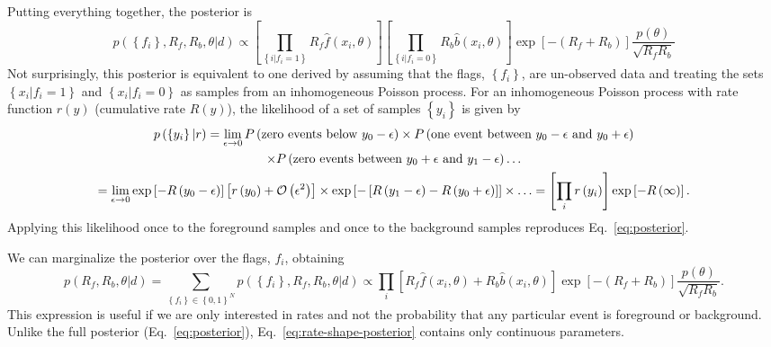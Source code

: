\documentclass[aps,prd]{revtex4-1}
\newcommand{\order}[1]{\mathcal{O}\left( #1 \right)}
\newcommand{\mathset}[1]{\left\{ #1 \right\}}
\begin{document}
Putting everything together, the posterior is
\begin{equation}
  \label{eq:posterior}
  p\left( \mathset{f_i}, R_f, R_b, \theta | d \right) \propto \left[
    \prod_{\mathset{i | f_i = 1}} R_f \hat{f}\left(x_i, \theta\right) \right]
  \left[ \prod_{\mathset{i | f_i = 0}} R_b \hat{b}\left( x_i, \theta\right)
  \right] \exp\left[ - \left(R_f + R_b\right) \right]
  \frac{p(\theta)}{\sqrt{R_f R_b}}
\end{equation}
Not surprisingly, this posterior is equivalent to one derived by
assuming that the flags, $\mathset{f_i}$, are un-observed data and
treating the sets $\mathset{x_i | f_i = 1}$ and $\mathset{x_i | f_i =
  0}$ as samples from an inhomogeneous Poisson process.  For an
inhomogeneous Poisson process with rate function $r(y)$ (cumulative
rate $R(y)$), the likelihood of a set of samples $\mathset{y_i}$ is
given by 
\begin{multline}
  p\left( \mathset{y_i} | r \right) = \lim_{\epsilon \to 0} P\left(
  \textnormal{zero events below } y_0 - \epsilon \right) \times
  P\left( \textnormal{one event between } y_0 - \epsilon \textnormal{
    and } y_0 + \epsilon \right) \\ \times P\left( \textnormal{zero
    events between } y_0+\epsilon \textnormal{ and } y_1 - \epsilon
  \right) \ldots \\ = \lim_{\epsilon \to 0} \exp\left[ - R\left(y_0 -
    \epsilon \right) \right] \left[ r\left( y_0 \right) +
    \order{\epsilon^2} \right] \times \exp\left[ - \left[ R\left( y_1
      - \epsilon\right) - R\left( y_0 + \epsilon\right) \right]
    \right] \times \ldots = \left[\prod_i r\left( y_i
    \right)\right] \exp\left[ - R\left( \infty \right) \right].
\end{multline}
Applying this likelihood once to the foreground samples and once to
the background samples reproduces Eq.~\eqref{eq:posterior}.

We can marginalize the posterior over the flags, $f_i$, obtaining
\begin{equation}
  \label{eq:rate-shape-posterior}
  p\left( R_f, R_b, \theta | d \right) = \sum_{\mathset{f_i} \in
    \mathset{0,1}^N} p\left( \mathset{f_i}, R_f, R_b, \theta | d \right)
  \propto \prod_{i} \left[ R_f \hat{f}\left(x_i, \theta\right) + R_b
    \hat{b}\left( x_i, \theta\right) \right] \exp\left[-\left( R_f +
      R_b \right) \right] \frac{p(\theta)}{\sqrt{R_f R_b}}.
\end{equation}
This expression is useful if we are only interested in rates and not
the probability that any particular event is foreground or background.
Unlike the full posterior (Eq.~\eqref{eq:posterior}),
Eq.~\eqref{eq:rate-shape-posterior} contains only continuous
parameters.
\end{document}
